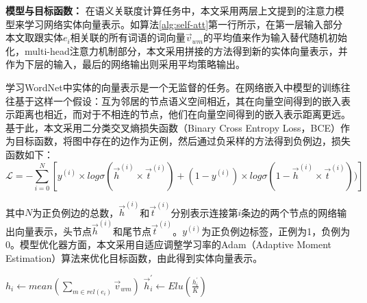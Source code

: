 \textbf{模型与目标函数：}
在语义关联度计算任务中，本文采用两层上文提到的注意力模型来学习网络实体向量表示。如算法\ref{alg:self-att}第一行所示，在第一层输入部分本文取跟实体$e_i$相关联的所有词语的词向量$\vec v_{wm}$的平均值来作为输入替代随机初始化，multi-head注意力机制部分，本文采用拼接的方法得到新的实体向量表示，并作为下层的输入，最后的网络输出则采用平均策略输出。

学习WordNet中实体的向量表示是一个无监督的任务。在网络嵌入中模型的训练往往基于这样一个假设：互为邻居的节点语义空间相近，其在向量空间得到的嵌入表示距离也相近，而对于不相连的节点，他们在向量空间得到的嵌入表示距离更远。基于此，本文采用二分类交叉熵损失函数（Binary Cross Entropy Loss，BCE）作为目标函数，将图中存在的边作为正例，然后通过负采样的方法得到负例边，损失函数如下：
\begin{equation}
    \mathcal{L} = -\sum_{i = 0}^{N} [y^{(i)} \times log\sigma(\vec h^{(i)} \times \vec t^{(i)})+(1 - y_{}^{(i)})\times log\sigma(1 - \vec h^{(i)} \times \vec t^{(i)}))]
    \label{wordnet_loss}
\end{equation}

\noindent 其中$N$为正负例边的总数，$\vec h^{(i)}$和$\vec t^{(i)}$分别表示连接第$i$条边的两个节点的网络输出向量表示，头节点$\vec h^{(i)}$和尾节点$\vec t^{(i)}$。$y^{(i)}$为正负例边标签，正例为1，负例为0。模型优化器方面，本文采用自适应调整学习率的Adam（Adaptive Moment Estimation）算法来优化目标函数，由此得到实体向量表示。

\begin{algorithm}
    \label{alg:self-att}
    $h_i \leftarrow mean(\sum_{m \in rel(e_i)} \vec v_{wm})$ \;
    $\vec h_i^{'} \leftarrow Elu(\frac{h_i^{'}}{K})$
\end{algorithm}

